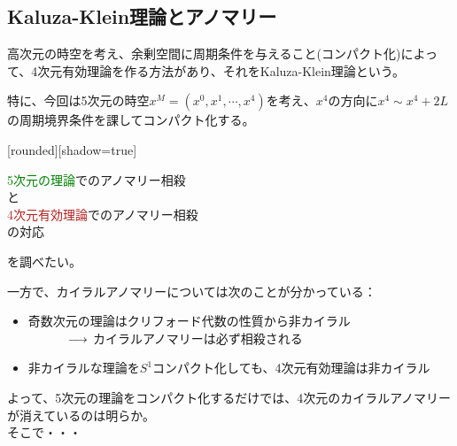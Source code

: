 \documentclass[
  unicode,a4paper,9pt,
  xcolor = {dvipsnames,svgnames},
  hyperref ={colorlinks=true,citecolor=Navy,linkcolor=NavyBlue,urlcolor=purple},
  ja=standard,lualatex
]{beamer}
\begin{document}
\subsection{Kaluza-Klein理論とアノマリー}

\begin{frame}{\subsecname}

  高次元の時空を考え、余剰空間に周期条件を与えること(コンパクト化)によって、4次元有効理論を作る方法があり、それをKaluza-Klein理論という。

  \vspace*{5pt}

  特に、今回は5次元の時空$x^{M}=(x^{0},x^{1},\cdots,x^{4})$を考え、$x^{4}$の方向に$x^{4}\sim x^{4}+2L$の周期境界条件を課してコンパクト化する。

  \pause
  \vspace*{10pt}

  [rounded][shadow=true]
  \begin{block}{}
    \centering
    \textcolor{Green}{5次元の理論}でのアノマリー相殺
    \\
    と
    \\
    \textcolor{FireBrick}{4次元有効理論}でのアノマリー相殺
    \\
    の対応
  \end{block}
  を調べたい。

\end{frame}


\begin{frame}

  一方で、カイラルアノマリーについては次のことが分かっている：

  \begin{itemize}
    \item 
    奇数次元の理論はクリフォード代数の性質から非カイラル\\
    $\hspace*{1cm}\ \longrightarrow\ $カイラルアノマリーは必ず相殺される
    \item 
    非カイラルな理論を$S^{1}$コンパクト化しても、4次元有効理論は非カイラル
  \end{itemize}

  \pause

  よって、5次元の理論をコンパクト化するだけでは、4次元のカイラルアノマリーが消えているのは明らか。\\

  そこで・・・  

\end{frame}
\end{document}
